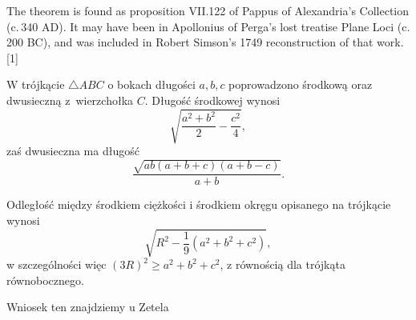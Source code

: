 \begin{corollary}
	The theorem is found as proposition VII.122 of Pappus of Alexandria's Collection (c. 340 AD). It may have been in Apollonius of Perga's lost treatise Plane Loci (c. 200 BC), and was included in Robert Simson's 1749 reconstruction of that work.[1]
\end{corollary}

\begin{corollary}
	W trójkącie $\triangle ABC$ o bokach długości $a, b, c$ poprowadzono środkową oraz dwusieczną z~wierzchołka $C$.
	Długość środkowej wynosi
	\begin{equation}
		\sqrt{\frac{a^2 + b^2}{2} - \frac{c^2}{4}},
	\end{equation}
	zaś dwusieczna ma długość
	\begin{equation}
		\frac{\sqrt{ab (a+b+c)(a+b-c)}}{a+b}.
	\end{equation}
\end{corollary}

\begin{corollary}
	Odległość między środkiem ciężkości i środkiem okręgu opisanego na trójkącie wynosi
	\begin{equation}
		\sqrt{R^2 - \frac 19 \left(a^2 + b^2 + c^2\right)},
	\end{equation}
	w szczególności więc $(3R)^2 \ge a^2 + b^2 + c^2$, z równością dla trójkąta równobocznego.
\end{corollary}

Wniosek ten znajdziemy u Zetela \cite[s. 72]{zetel_2020}